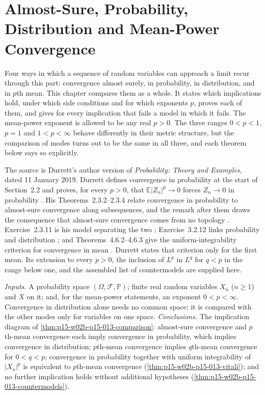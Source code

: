 \chapter{Almost-Sure, Probability, Distribution and Mean-Power Convergence}
\label{sec:p15-w02b-p15-013-modes}

Four ways in which a sequence of random variables can approach a limit
recur through this part: convergence almost surely, in probability, in
distribution, and in \(p\)th mean. This chapter compares them as a
whole. It states which implications hold, under which side conditions
and for which exponents \(p\), proves each of them, and gives for every
implication that fails a model in which it fails. The mean-power
exponent is allowed to be any real \(p>0\). The three ranges
\(0<p<1\), \(p=1\) and \(1<p<\infty\) behave differently in their
metric structure, but the comparison of modes turns out to be the same
in all three, and each theorem below says so explicitly.

The source is Durrett's author version of \emph{Probability: Theory and
Examples}, dated 11 January 2019. Durrett defines convergence in
probability at the start of Section~2.2 \cite[p.~56]{DurrettPTEAuthor2019}
and proves, for every \(p>0\), that \(\mathbb E|Z_n|^p\to0\) forces
\(Z_n\to0\) in probability \cite[Lemma~2.2.2, p.~57]{DurrettPTEAuthor2019}.
His Theorems~2.3.2--2.3.4 relate convergence in probability to
almost-sure convergence along subsequences, and the remark after them
draws the consequence that almost-sure convergence comes from no
topology \cite[pp.~68--69]{DurrettPTEAuthor2019}. Exercise~2.3.11 is his
model separating the two \cite[p.~75]{DurrettPTEAuthor2019}; Exercise~3.2.12
links probability and distribution
\cite[p.~124]{DurrettPTEAuthor2019}; and Theorems~4.6.2--4.6.3 give the
uniform-integrability criterion for convergence in mean
\cite[pp.~245--246]{DurrettPTEAuthor2019}. Durrett states that criterion
only for the first mean. Its extension to every \(p>0\), the inclusion
of \(L^p\) in \(L^q\) for \(q<p\) in the range below one, and the
assembled list of countermodels are supplied here.

\emph{Inputs.} A probability space \((\Omega,\mathcal F,\mathbb P)\);
finite real random variables \(X_n\) (\(n\geq1\)) and \(X\) on it; and,
for the mean-power statements, an exponent \(0<p<\infty\). Convergence in
distribution alone needs no common space; it is compared with the
other modes only for variables on one space.
\emph{Conclusions.} The implication diagram of
\cref{thm:p15-w02b-p15-013-comparison}: almost-sure convergence and
\(p\)th-mean convergence each imply convergence in probability, which
implies convergence in distribution; \(p\)th-mean convergence implies
\(q\)th-mean convergence for \(0<q<p\); convergence in probability
together with uniform integrability of \(|X_n|^p\) is equivalent to
\(p\)th-mean convergence (\cref{thm:p15-w02b-p15-013-vitali}); and no
further implication holds without additional hypotheses
(\cref{thm:p15-w02b-p15-013-countermodels}).

